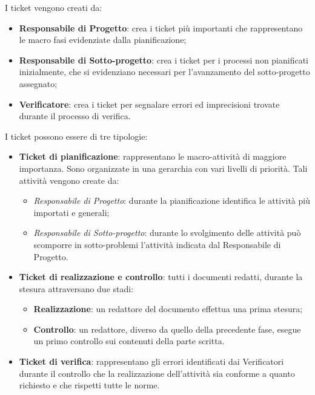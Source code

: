   I ticket vengono creati da:
 \begin{itemize}
 

    \item \textbf{Responsabile di Progetto}: crea i ticket più importanti che rappresentano le macro fasi evidenziate dalla pianificazione; 
	\item \textbf{Responsabile di Sotto-progetto}: crea i ticket per i processi non pianificati inizialmente, che si evidenziano necessari per l’avanzamento del sotto-progetto assegnato; 
	\item \textbf{Verificatore}: crea i ticket per segnalare errori ed imprecisioni trovate durante il processo di verifica. 
 \end{itemize}


I ticket possono essere di tre tipologie:
\begin{itemize}


\item \textbf{Ticket di pianificazione}: rappresentano le macro-attività di maggiore importanza. Sono organizzate in una gerarchia con vari livelli di priorità.
 Tali attività vengono create da: 
\begin{itemize}
\item \emph{Responsabile di Progetto}: durante la pianificazione identifica le attività più importati e generali; 
\item \emph{Responsabile di Sotto-progetto}: durante lo svolgimento delle attività può scomporre in sotto-problemi l’attività indicata dal Responsabile di Progetto. 
\end{itemize}


\item \textbf{Ticket di realizzazione e controllo}: tutti i documenti redatti, durante la stesura attraversano due stadi: 
\begin{itemize}
\item \textbf{Realizzazione}: un redattore del documento effettua una prima stesura; 
\item \textbf{Controllo}: un redattore, diverso da quello della precedente fase, esegue un primo controllo sui contenuti della parte scritta. 
\end{itemize}


\item \textbf{Ticket di verifica}: rappresentano gli errori identificati dai Verificatori durante 
il controllo che la realizzazione dell'attività sia conforme a quanto richiesto e che 
rispetti tutte le norme.
\end{itemize}



